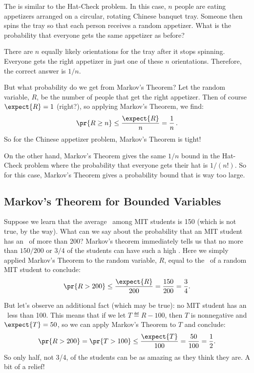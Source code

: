 The  is similar to the Hat-Check problem.
In this case, $n$ people are eating appetizers arranged on a circular,
rotating Chinese banquet tray.  Someone then spins the tray so that each
person receives a random appetizer.  What is the probability that everyone
gets the same appetizer as before?

There are $n$ equally likely orientations for the tray after it stops
spinning.  Everyone gets the right appetizer in just one of these $n$
orientations.  Therefore, the correct answer is $1/n$.

But what probability do we get from Markov's Theorem?  Let the random
variable, $R$, be the number of people that get the right appetizer.  
Then of course $\expect{R} = 1$ (right?), so
applying Markov's Theorem, we find:
\begin{displaymath}
  \pr{R \geq n} \leq \frac{\expect{R}}{n} = \frac{1}{n}\,.
\end{displaymath}
So for the Chinese appetizer problem, Markov's Theorem is tight!

On the other hand, Markov's Theorem gives the same $1/n$ bound in the
Hat-Check problem where the probability that everyone gets
their hat is $1/(n!)$.  So for this case, Markov's Theorem gives a
probability bound that is way too large.

\subsection{Markov's Theorem for Bounded Variables}

Suppose we learn that the average \IQ\ among MIT students is 150 (which is
not true, by the way).  What can we say about the probability that an MIT
student has an \IQ\ of more than 200?  Markov's theorem immediately tells
us that no more than $150/200$ or $3/4$ of the students can have such a
high \IQ.  Here we simply applied Markov's Theorem to the random variable,
$R$, equal to the \IQ\ of a random MIT student to conclude:
\[
\pr{R > 200} \leq \frac{\expect{R}}{200}= \frac{150}{200} = \frac{3}{4}.
\]

But let's observe an additional fact (which may be true): no MIT student
has an \IQ\ less than 100.  This means that if we let $T \eqdef R-100$,
then $T$ is nonnegative and $\expect{T} = 50$, so we can apply Markov's
Theorem to $T$ and conclude:
\[
\pr{R > 200} = \pr{T > 100} \leq \frac{\expect{T}}{100}= \frac{50}{100} =
\frac{1}{2}.
\]
So only half, not 3/4, of the students can be as amazing as they think
they are.  A bit of a relief!

